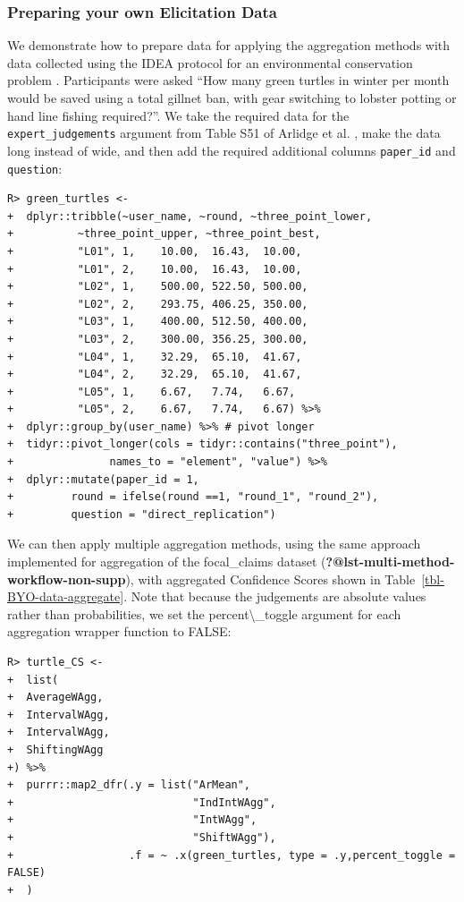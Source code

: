 \documentclass[article]{jss}
\begin{document}
\hypertarget{preparing-your-own-elicitation-data}{%
\subsubsection{Preparing your own Elicitation
Data}\label{preparing-your-own-elicitation-data}}

We demonstrate how to prepare data for applying the 
aggregation methods with data collected using the IDEA protocol for an
environmental conservation problem \citep{Arlidge2020} . Participants
were asked ``How many green turtles in winter per month would be saved
using a total gillnet ban, with gear switching to lobster potting or
hand line fishing required?''. We take the required data for the
\texttt{expert\_judgements} argument from Table S51 of Arlidge et al.
\citeyearpar{Arlidge2020}, make the data long instead of wide, and then
add the required additional columns \texttt{paper\_id} and
\texttt{question}:

\begin{verbatim}
R> green_turtles <- 
+  dplyr::tribble(~user_name, ~round, ~three_point_lower, 
+          ~three_point_upper, ~three_point_best,
+          "L01", 1,    10.00,  16.43,  10.00,
+          "L01", 2,    10.00,  16.43,  10.00,
+          "L02", 1,    500.00, 522.50, 500.00,
+          "L02", 2,    293.75, 406.25, 350.00,
+          "L03", 1,    400.00, 512.50, 400.00,
+          "L03", 2,    300.00, 356.25, 300.00,
+          "L04", 1,    32.29,  65.10,  41.67,
+          "L04", 2,    32.29,  65.10,  41.67,
+          "L05", 1,    6.67,   7.74,   6.67,
+          "L05", 2,    6.67,   7.74,   6.67) %>% 
+  dplyr::group_by(user_name) %>% # pivot longer
+  tidyr::pivot_longer(cols = tidyr::contains("three_point"), 
+               names_to = "element", "value") %>% 
+  dplyr::mutate(paper_id = 1, 
+         round = ifelse(round ==1, "round_1", "round_2"),
+         question = "direct_replication")
\end{verbatim}

We can then apply multiple aggregation methods, using the same approach
implemented for aggregation of the {focal\_claims} dataset
(\textbf{?@lst-multi-method-workflow-non-supp}), with aggregated
Confidence Scores shown in Table~\ref{tbl-BYO-data-aggregate}. Note that
because the judgements are absolute values rather than probabilities, we
set the {percent\textbackslash\_toggle} argument for each aggregation
wrapper function to {FALSE}:

\begin{verbatim}
R> turtle_CS <- 
+  list(
+  AverageWAgg,
+  IntervalWAgg,
+  IntervalWAgg,
+  ShiftingWAgg
+) %>%
+  purrr::map2_dfr(.y = list("ArMean",
+                            "IndIntWAgg",
+                            "IntWAgg",
+                            "ShiftWAgg"),
+                  .f = ~ .x(green_turtles, type = .y,percent_toggle = FALSE)
+  )
\end{verbatim}
\end{document}

